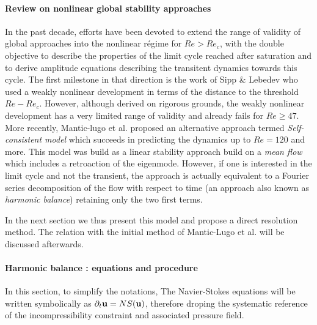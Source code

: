 \documentclass[twocolumn,10pt]{asme2ej}
\begin{document}
\paragraph{Review on nonlinear global stability approaches}
In the past decade, efforts have been devoted to extend the range of validity of global approaches into the nonlinear régime for $Re>Re_c$, with the double objective to describe the properties of the limit cycle reached after saturation and to derive amplitude equations describing the transitent dynamics towards this cycle.
 The first milestone in that direction is the work of Sipp \& Lebedev who used a weakly nonlinear development in terms of the distance to the threshold $Re-Re_c$. However, although derived on rigorous grounds, the weakly nonlinear development has a very limited range of validity and already fails for $Re\ge47$.
More recently,  Mantic-lugo et al.  proposed an alternative approach termed {\em Self-consistent model} which succeeds in predicting the dynamics up to $Re =120$ and more. 
This model was build as a linear stability approach build on a {\em mean flow} which includes a 
retroaction of the eigenmode. However, if one is interested in the limit cycle and not the transient,
the approach is actually equivalent to a Fourier series decomposition of the flow with respect to time (an approach also known as {\em harmonic balance}) retaining only the two first terms. 

In the next section we thus present this model and propose a direct resolution method. The relation with the initial method of Mantic-Lugo et al. will be discussed afterwards.

\paragraph{Harmonic balance : equations and procedure }

In this section, to simplify the notations, The Navier-Stokes equations will be written symbolically as 
$\partial_t  {\bf u }  = NS(  {\bf u } )$, therefore droping the systematic reference of the incompressibility constraint and associated pressure field.
\end{document}
